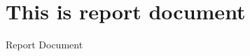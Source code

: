 \documentclass[a4papper, 12pt]{report}
\begin{document}
\chapter{This is report document}
Report Document
\end{document}
